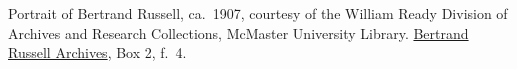 Portrait of Bertrand Russell, ca.~1907, courtesy of the William Ready
Division of Archives and Research Collections, McMaster University
Library. \href{http://www.mcmaster.ca/russdocs/russell.htm}{Bertrand Russell Archives}, Box 2, f.~4.
